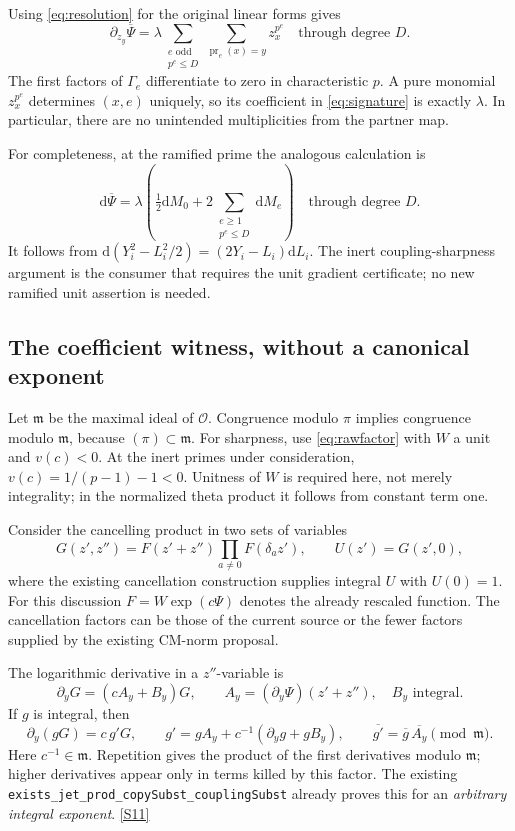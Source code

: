 \documentclass[11pt,letterpaper]{article}
\theoremstyle{remark}
\newcommand{\OO}{\mathcal O}
\newcommand{\dd}{\mathrm d}
\newcommand{\code}[1]{{\small\nolinkurl{#1}}}
\newcommand{\src}[1]{\hyperref[src:#1]{[S#1]}}
\begin{document}
Using \eqref{eq:resolution} for the original linear forms gives
\begin{equation}
 \partial_{z_y}\overline\Psi
 =\lambda\sum_{\substack{e\text{ odd}\\p^e\le D}}
       \sum_{\operatorname{pr}_e(x)=y}z_x^{p^e}
 \quad\text{through degree }D. \label{eq:signature}
\end{equation}
The first factors of \(\Gamma_e\) differentiate to zero in characteristic
\(p\). A pure monomial \(z_x^{p^e}\) determines \((x,e)\) uniquely, so its
coefficient in \eqref{eq:signature} is exactly \(\lambda\). In particular,
there are no unintended multiplicities from the partner map.

For completeness, at the ramified prime the analogous calculation is
\begin{equation}
 \dd\overline\Psi
 =\lambda\left(\tfrac12\dd M_0+
       2\sum_{\substack{e\ge1\\p^e\le D}}\dd M_e\right)
 \quad\text{through degree }D. \label{eq:ramgradient}
\end{equation}
It follows from \(\dd(Y_i^2-L_i^2/2)=(2Y_i-L_i)\dd L_i\).
The inert coupling-sharpness argument is the consumer that requires the unit
gradient certificate; no new ramified unit assertion is needed.

\subsection{The coefficient witness, without a canonical exponent}

Let \(\mathfrak m\) be the maximal ideal of \(\OO\). Congruence modulo
\(\pi\) implies congruence modulo \(\mathfrak m\), because
\((\pi)\subset\mathfrak m\). For sharpness, use
\eqref{eq:rawfactor} with \(W\) a unit and \(v(c)<0\). At the inert primes
under consideration, \(v(c)=1/(p-1)-1<0\). Unitness of \(W\) is required
here, not merely integrality; in the normalized theta product it follows from
constant term one.

Consider the cancelling product in two sets of variables
\[
 G(z',z'')=F(z'+z'')\prod_{a\ne0}F(\delta_a z'),\qquad
 U(z')=G(z',0),
\]
where the existing cancellation construction supplies integral \(U\) with
\(U(0)=1\). For this discussion \(F=W\exp(c\Psi)\) denotes the already
rescaled function. The cancellation factors can be those of the current source
or the fewer factors supplied by the existing CM-norm proposal.

The logarithmic derivative in a \(z''\)-variable is
\[
 \partial_yG=(cA_y+B_y)G,
 \qquad A_y=(\partial_y\Psi)(z'+z''),\quad B_y\text{ integral}.
\]
If \(g\) is integral, then
\begin{equation}
 \partial_y(gG)=c\,g'G,\qquad
 g'=gA_y+c^{-1}(\partial_yg+gB_y),\qquad
 \overline{g'}=\overline g\,\overline{A_y}\pmod{\mathfrak m}.
 \label{eq:recurrence}
\end{equation}
Here \(c^{-1}\in\mathfrak m\). Repetition gives the product of the first
derivatives modulo \(\mathfrak m\); higher derivatives appear only in terms
killed by this factor. The existing
\code{exists_jet_prod_copySubst_couplingSubst} already proves this for an
\emph{arbitrary integral exponent}. \src{11}
\end{document}
